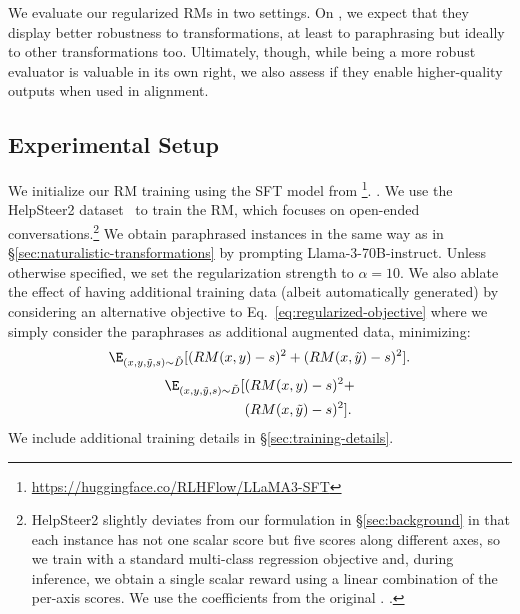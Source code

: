 We evaluate our regularized RMs in two settings. On \benchmark, we expect that they display better robustness to transformations, at least to paraphrasing but ideally to other transformations too. Ultimately, though, while being a more robust evaluator is valuable in its own right, we also assess if they enable higher-quality outputs
\iflongversion
when used
\fi
in alignment.

\subsection{Experimental Setup} \label{sec:exp-setup}

We initialize our RM training using the SFT model from \iflongversion
\citet{dong2024rlhf}\footnote{\url{https://huggingface.co/RLHFlow/LLaMA3-SFT}}.
\else
\citet{dong2024rlhf}.
\fi
We use the HelpSteer2 dataset~\citep{wang2024helpsteer} to train the RM, which focuses on open-ended conversations.\footnote{HelpSteer2 slightly deviates from our formulation in \S\ref{sec:background} in that each instance has not one scalar score but five scores along different axes, so we train with a standard multi-class regression objective and, during inference, we obtain a single scalar reward using a linear combination of the per-axis scores. We use the coefficients from the original
\iflongversion
\citet[\S H, for the 70B model]{wang2024helpsteer}.
\else
\citet{wang2024helpsteer}.
\fi
}
We obtain paraphrased instances in the same way as in \S\ref{sec:naturalistic-transformations} by prompting Llama-3-70B-instruct. Unless otherwise specified, we set the regularization strength to $\alpha=10$.
We also ablate the effect of having additional training data (albeit automatically generated) by considering an alternative objective to Eq.~\ref{eq:regularized-objective} where we simply consider the paraphrases as additional augmented data, minimizing:
\ifonecolumn
\begin{align} \label{eq:augmentation-objective}
\begin{split}
    \E_{(x,y,\tilde{y},s)\sim \tilde{D}}[(RM(x,y)-s)^2 + 
    (RM(x,\tilde{y})-s)^2].
\end{split}
\end{align}
\else
\vspace{-1mm}
\begin{align} \label{eq:augmentation-objective}
\begin{split}
    \E_{(x,y,\tilde{y},s)\sim \tilde{D}}[&(RM(x,y)-s)^2 + \\
    &(RM(x,\tilde{y})-s)^2].
\end{split}
\end{align}
\vspace{-1mm}
\fi
We include additional training details in \S\ref{sec:training-details}.

